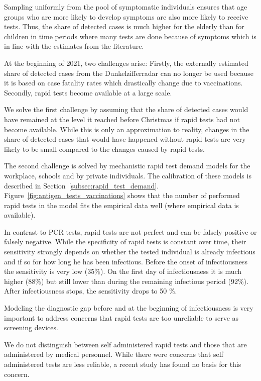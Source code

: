 Sampling uniformly from the pool of symptomatic individuals ensures that age groups who
are more likely to develop symptoms are also more likely to receive tests. Thus, the
share of detected cases is much higher for the elderly than for children in time periods
where many tests are done because of symptoms which is in line with the estimates from
the literature. 

At the beginning of 2021, two challenges arise: Firstly, the externally estimated share
of detected cases from the Dunkelzifferradar can no longer be used because it is based on
case fatality rates which drastically change due to vaccinations. Secondly, rapid tests
become available at a large scale.

We solve the first challenge by assuming that the share of detected cases would have
remained at the level it reached before Christmas if rapid tests had not become
available. While this is only an approximation to reality, changes in the share of
detected cases that would have happened without rapid tests are very likely to be small
compared to the changes caused by rapid tests.

The second challenge is solved by mechanistic rapid test demand models for the workplace,
schools and by private individuals. The calibration of these models is described in
Section~\ref{subsec:rapid_test_demand}. Figure~\ref{fig:antigen_tests_vaccinations} shows
that the number of performed rapid tests in the model fits the empirical data well (where
empirical data is available).

In contrast to PCR tests, rapid tests are not perfect and can be falsely positive or
falsely negative. While the specificity of rapid tests is constant over time, their
sensitivity strongly depends on whether the tested individual is already infectious and
if so for how long he has been infectious. Before the onset of infectiousness the
sensitivity is very low (35\%). On the first day of infectiousness it is much higher
(88\%) but still lower than during the remaining infectious period (92\%). After
infectiousness stops, the sensitivity drops to 50 \%.

Modeling the diagnostic gap before and at the beginning of infectiousness is very
important to address concerns that rapid tests are too unreliable to serve as screening
devices.

We do not distinguish between self administered rapid tests and those that are
administered by medical personnel. While there were concerns that self administered tests
are less reliable, a recent study has found no basis for this concern.

